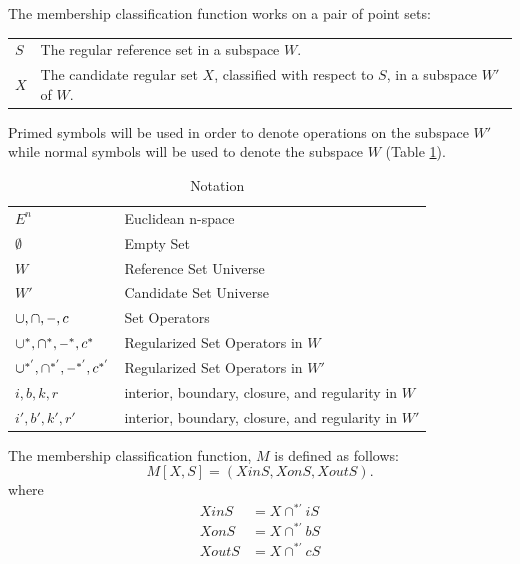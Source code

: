 \documentclass[a4paper,11pt,oneside]{article}
\makeatletter
\newcommand{\minus}{\scalebox{0.9}[1.0]{$-$}} %
\newenvironment{conditions}
  {\par\vspace{\abovedisplayskip}\noindent\begin{tabular}{>{$}l<{$} @{${}={}$} l}}
  {\end{tabular}\par\vspace{\belowdisplayskip}}
\makeatother
\begin{document}
The membership classification function works on a pair of point sets:

\begin{conditions}
	S     &  The regular reference set in a subspace $W$. \\
	X     &  The candidate regular set $X$, classified with respect to $S$, in a subspace $W'$ of $W$. \\
\end{conditions}

Primed symbols will be used	in order to denote operations on the subspace $W'$ while normal symbols will be used to denote the subspace $W$ (Table \ref{table:notations}).
 
\begin{table}
	\caption{Notation}
	\label{table:notations}
	\begin{tabularx}{\textwidth}{p{}X}
		\toprule
		$E^n$                                        & Euclidean n-space                                   \\
		$\emptyset$                                  & Empty Set                                           \\
		$W$                                          & Reference Set Universe                              \\
		$W'$                                         & Candidate Set Universe                              \\
		$\cup, \cap, \minus, c$                     & Set Operators                                       \\
		$\cup^*, \cap^*, \minus^*, c^*$             & Regularized Set Operators in $W$                    \\
		$\cup^{*'}, \cap^{*'}, \minus^{*'}, c^{*'}$ & Regularized Set Operators in $W'$                   \\
		$i, b, k, r$                                 & interior, boundary, closure, and regularity in $W$  \\
		$i', b', k', r'$                             & interior, boundary, closure, and regularity in $W'$ \\
		\bottomrule
	\end{tabularx}
\end{table}

\begin{definition}
	The membership classification function, $M$ is defined as follows:
	\begin{equation}
		M[X, S] = (XinS, XonS, XoutS).
	\end{equation}
	where
	\begin{align*}
		XinS  & = X \cap^{*'} iS \\
		XonS  & = X \cap^{*'} bS \\
		XoutS & = X \cap^{*'} cS 
	\end{align*}
\end{definition}
\end{document}
